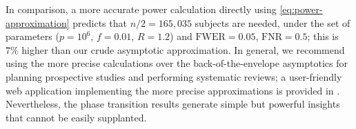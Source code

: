 In comparison, a more accurate power calculation directly using \eqref{eq:power-approximation} predicts that $n / 2 = 165,035$ subjects are needed, under the set of parameters ($p=10^6$, $f=0.01$, $R=1.2$) and $\mathrm{FWER}=0.05$, $\mathrm{FNR}=0.5$; this is $7\%$ higher than our crude asymptotic approximation.
In general, we recommend using the more precise calculations over the back-of-the-envelope asymptotics for planning prospective studies and performing systematic reviews;
a user-friendly web application implementing the more precise approximations is provided in \cite{gao2019upass}.
Nevertheless, the phase transition results generate simple but powerful insights that cannot be easily supplanted.
